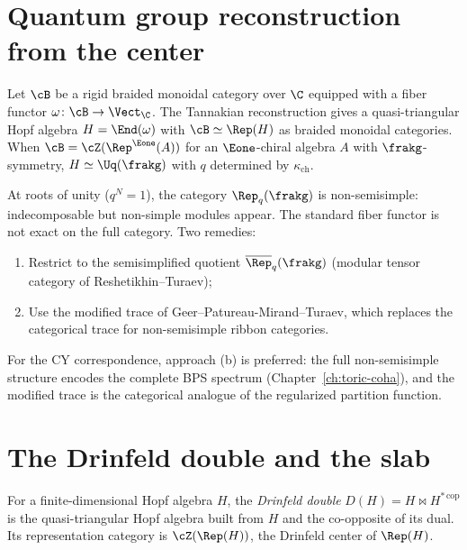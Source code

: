 \section{Quantum group reconstruction from the center}
\label{sec:qg-reconstruction}

\begin{proposition}
\label{prop:tannakian-reconstruction}
Let $\cB$ be a rigid braided monoidal category over $\C$ equipped
with a fiber functor $\omega \colon \cB \to \Vect_\C$. The
Tannakian reconstruction gives a quasi-triangular Hopf algebra
$H = \End(\omega)$ with $\cB \simeq \Rep(H)$ as braided monoidal
categories. When $\cB = \cZ(\Rep^{\Eone}(A))$ for an $\Eone$-chiral
algebra $A$ with $\frakg$-symmetry, $H \simeq \Uq(\frakg)$ with
$q$ determined by $\kappa_{\mathrm{ch}}$.
\end{proposition}

\begin{remark}
\label{rem:non-semisimple-reconstruction}
At roots of unity ($q^N = 1$), the category $\Rep_q(\frakg)$ is
non-semisimple: indecomposable but non-simple modules appear. The
standard fiber functor is not exact on the full category. Two
remedies:
\begin{enumerate}[label=(\alph*)]
 \item Restrict to the semisimplified quotient
 $\overline{\Rep}_q(\frakg)$ (modular tensor category of
 Reshetikhin--Turaev);
 \item Use the modified trace of Geer--Patureau-Mirand--Turaev,
 which replaces the categorical trace for non-semisimple ribbon
 categories.
\end{enumerate}
For the CY correspondence, approach (b) is preferred: the full
non-semisimple structure encodes the complete BPS spectrum
(Chapter~\ref{ch:toric-coha}), and the modified trace is the
categorical analogue of the regularized partition function.
\end{remark}


\section{The Drinfeld double and the slab}
\label{sec:drinfeld-double-slab}

\begin{definition}
\label{def:drinfeld-double}
For a finite-dimensional Hopf algebra $H$, the \emph{Drinfeld double}
$D(H) = H \bowtie H^{*\,\mathrm{cop}}$ is the quasi-triangular Hopf
algebra built from $H$ and the co-opposite of its dual. Its
representation category is $\cZ(\Rep(H))$, the Drinfeld center of
$\Rep(H)$.
\end{definition}

